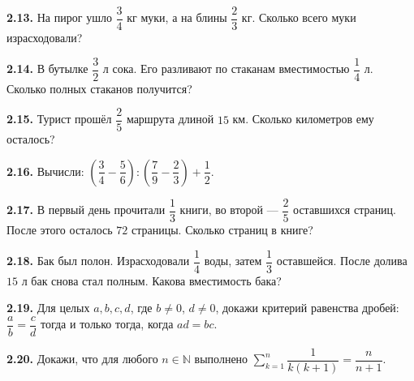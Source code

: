 \noindent\begin{minipage}[t]{\linewidth}\textbf{2.13.} На пирог ушло \(\dfrac{3}{4}\) кг муки, а на блины \(\dfrac{2}{3}\) кг. Сколько всего муки израсходовали?\par\end{minipage}\par
\noindent\begin{minipage}[t]{\linewidth}\textbf{2.14.} В бутылке \(\dfrac{3}{2}\) л сока. Его разливают по стаканам вместимостью \(\dfrac{1}{4}\) л. Сколько полных стаканов получится?\par\end{minipage}\par
\noindent\begin{minipage}[t]{\linewidth}\textbf{2.15.} Турист прошёл \(\dfrac{2}{5}\) маршрута длиной \(15\) км. Сколько километров ему осталось?\par\end{minipage}\par
\noindent\begin{minipage}[t]{\linewidth}\textbf{2.16.}\starmark{} Вычисли: \((\dfrac{3}{4} - \dfrac{5}{6}) : (\dfrac{7}{9} - \dfrac{2}{3}) + \dfrac{1}{2}\).\par\end{minipage}\par
\noindent\begin{minipage}[t]{\linewidth}\textbf{2.17.}\starmark{} В первый день прочитали \(\dfrac{1}{3}\) книги, во второй — \(\dfrac{2}{5}\) оставшихся страниц. После этого осталось \(72\) страницы. Сколько страниц в книге?\par\end{minipage}\par
\noindent\begin{minipage}[t]{\linewidth}\textbf{2.18.}\starmark{} Бак был полон. Израсходовали \(\dfrac{1}{4}\) воды, затем \(\dfrac{1}{3}\) оставшейся. После долива \(15\) л бак снова стал полным. Какова вместимость бака?\par\end{minipage}\par
\noindent\begin{minipage}[t]{\linewidth}\textbf{2.19.} Для целых \(a,b,c,d\), где \(b\ne0\), \(d\ne0\), докажи критерий равенства дробей: \(\dfrac ab=\dfrac cd\) тогда и только тогда, когда \(ad=bc\).\par\end{minipage}\par
\noindent\begin{minipage}[t]{\linewidth}\textbf{2.20.} Докажи, что для любого \(n\in\mathbb N\) выполнено \(\sum_{k=1}^{n}\dfrac1{k(k+1)}=\dfrac n{n+1}\).\par\end{minipage}\par
\endgroup
